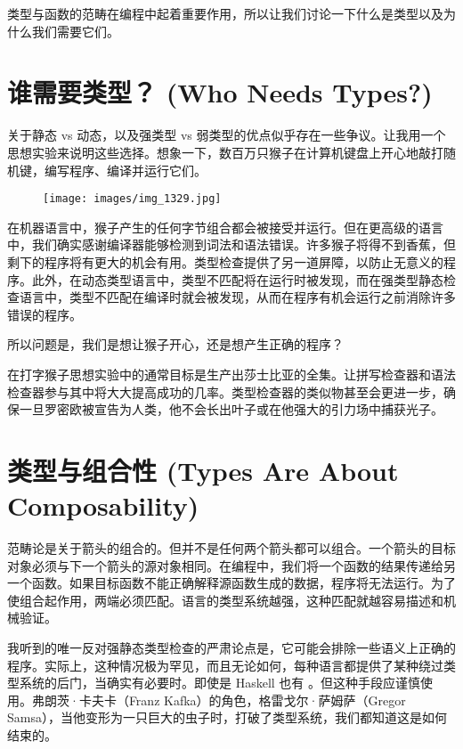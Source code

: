 
\lettrine[lhang=0.17]{类}{型与函数的范畴}在编程中起着重要作用，所以让我们讨论一下什么是类型以及为什么我们需要它们。

\section{谁需要类型？ (Who Needs Types?)}

关于静态 vs 动态，以及强类型 vs 弱类型的优点似乎存在一些争议。让我用一个思想实验来说明这些选择。想象一下，数百万只猴子在计算机键盘上开心地敲打随机键，编写程序、编译并运行它们。

\begin{figure}[H]
  \centering
  \texttt{[image: images/img\_1329.jpg]}
\end{figure}

\noindent
在机器语言中，猴子产生的任何字节组合都会被接受并运行。但在更高级的语言中，我们确实感谢编译器能够检测到词法和语法错误。许多猴子将得不到香蕉，但剩下的程序将有更大的机会有用。类型检查提供了另一道屏障，以防止无意义的程序。此外，在动态类型语言中，类型不匹配将在运行时被发现，而在强类型静态检查语言中，类型不匹配在编译时就会被发现，从而在程序有机会运行之前消除许多错误的程序。

所以问题是，我们是想让猴子开心，还是想产生正确的程序？

在打字猴子思想实验中的通常目标是生产出莎士比亚的全集。让拼写检查器和语法检查器参与其中将大大提高成功的几率。类型检查器的类似物甚至会更进一步，确保一旦罗密欧被宣告为人类，他不会长出叶子或在他强大的引力场中捕获光子。

\section{类型与组合性 (Types Are About Composability)}

范畴论是关于箭头的组合的。但并不是任何两个箭头都可以组合。一个箭头的目标对象必须与下一个箭头的源对象相同。在编程中，我们将一个函数的结果传递给另一个函数。如果目标函数不能正确解释源函数生成的数据，程序将无法运行。为了使组合起作用，两端必须匹配。语言的类型系统越强，这种匹配就越容易描述和机械验证。

我听到的唯一反对强静态类型检查的严肃论点是，它可能会排除一些语义上正确的程序。实际上，这种情况极为罕见，而且无论如何，每种语言都提供了某种绕过类型系统的后门，当确实有必要时。即使是 Haskell 也有 。但这种手段应谨慎使用。弗朗茨·卡夫卡（Franz Kafka）的角色，格雷戈尔·萨姆萨（Gregor Samsa），当他变形为一只巨大的虫子时，打破了类型系统，我们都知道这是如何结束的。

